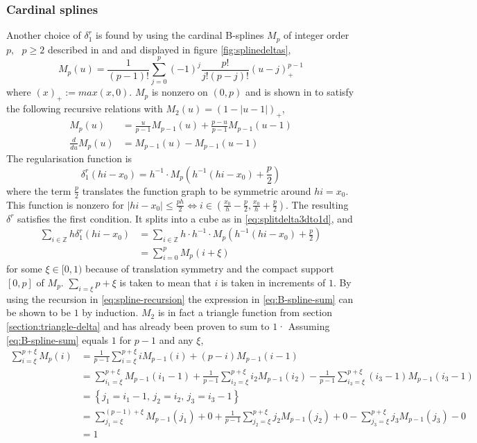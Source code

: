 \documentclass[a4paper,
twoside=false,abstract=false,numbers=noenddot,
titlepage=false,headings=small,parskip=half,version=last]{scrartcl}
\begin{document}
\subsubsection{Cardinal splines}
Another choice of $\delta^r_1$ is found by using the cardinal B-splines $M_p$ of integer order $p,\text{ }p\geq2$ described in \cite{B-spline-paper} and \cite{spectralewald} and displayed in figure \ref{fig:splinedeltas},
\begin{equation}
M_p(u) = \frac{1}{(p-1)!} \sum^p_{j=0} (-1)^j \frac{p!}{j!(p-j)!}(u-j)^{p-1}_+\label{eq:cardinalspline-definition}
\end{equation}
where $(x)_+ := max(x,0)$.
$M_p$ is nonzero on $(0,p)$ and is shown in \cite{B-spline-paper} to satisfy the following recursive relations with $M_2(u) = (1-|u-1|)_+$,
\begin{align}
M_p(u) &= \frac{u}{p-1}M_{p-1}(u) + \frac{p-u}{p-1}M_{p-1}(u-1)\label{eq:spline-recursion}\\
\frac{d}{du}M_p(u) &= M_{p-1}(u) - M_{p-1}(u-1)\label{eq:spline-derivative-recursion}
\end{align}
The regularisation function is
\begin{equation}
\delta^r_1(hi-x_0) = h^{-1}\cdot M_p(h^{-1}(hi-x_0)+\frac{p}{2})\nonumber
\end{equation}
where the term $\frac{p}{2}$ translates the function graph to be symmetric around $hi=x_0$.
This function is nonzero for $|hi-x_0| \leq \frac{ph}{2} \Leftrightarrow i \in (\frac{x_0}{h}-\frac{p}{2},\frac{x_0}{h}+\frac{p}{2})$.
The resulting $\delta^r$ satisfies the first condition. It splits into a cube as in \eqref{eq:splitdelta3dto1d}, and
\begin{align}
\sum_{i\in \mathbb{Z}}h\delta^{r}_1(hi-x_0) &= \sum_{i\in \mathbb{Z}} h\cdot h^{-1} \cdot M_p(h^{-1}(hi-x_0)+\frac{p}{2})\nonumber\\
		&= \sum_{i=0}^{p} M_p(i+\xi)\label{eq:B-spline-sum}
\end{align}
for some $\xi\in[0,1)$ because of translation symmetry and the compact support $[0,p]$ of $M_p$. $\sum_{i=\xi}{p+\xi}$ is taken to mean that $i$ is taken in increments of $1$. By using the recursion in \eqref{eq:spline-recursion} the expression in \eqref{eq:B-spline-sum} can be shown to be $1$ by induction.
$M_2$ is in fact a triangle function from section \ref{section:triangle-delta} and has already been proven to sum to $1$· Assuming \eqref{eq:B-spline-sum} equals $1$ for $p-1$ and any $\xi$,
\begin{align}
\sum_{i=\xi}^{p+\xi} M_p(i) &= \frac{1}{p-1}\sum_{i=\xi}^{p+\xi} iM_{p-1}(i) + (p-i)M_{p-1}(i-1)\nonumber\\
		&= \sum_{i_1=\xi}^{p+\xi} M_{p-1}(i_1-1) + \frac{1}{p-1}\sum_{i_2=\xi}^{p+\xi} i_2M_{p-1}(i_2) - \frac{1}{p-1}\sum_{i_3=\xi}^{p+\xi} (i_3-1)M_{p-1}(i_3-1)\nonumber\\
		&= \left\{ j_1 = i_1-1\text{, } j_2 = i_2\text{, }j_3 = i_3-1\right\}\nonumber\\
		&= \sum_{j_1=\xi}^{(p-1)+\xi} M_{p-1}(j_1) + 0 + \frac{1}{p-1}\sum_{j_2=\xi}^{p+\xi} j_2M_{p-1}(j_2) + 0 - \sum_{j_3=\xi}^{p+\xi} j_3M_{p-1}(j_3) - 0\nonumber\\
		&= 1\nonumber
\end{align}
\end{document}
